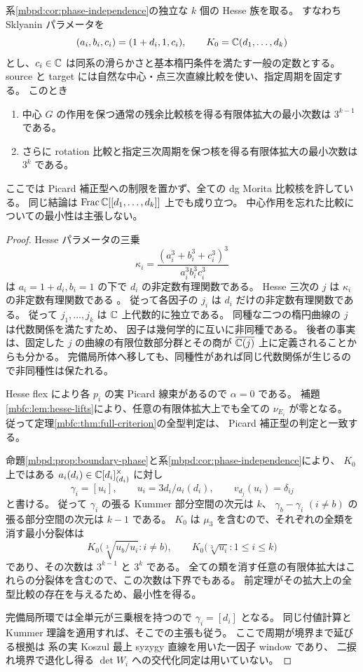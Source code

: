 \begin{theorem}[独立境界位相の全比較核に対する鋭い次数]
\label{mbfc:thm:sharp-all-types}
系\ref{mbpd:cor:phase-independence}の独立な $k$ 個の Hesse 族を取る。
すなわち Sklyanin パラメータを
\[
 (a_i,b_i,c_i)=(1+d_i,1,c_i),\qquad
 K_0=\mathbb C(d_1,\ldots,d_k)
\]
とし、$c_i\in\mathbb C$ は同系の滑らかさと基本楕円条件を満たす一般の定数とする。
source と target には自然な中心・点三次直線比較を使い、指定周期を固定する。
このとき
\begin{enumerate}
 \item 中心 $G$ の作用を保つ通常の残余比較核を得る有限体拡大の最小次数は
       $3^{k-1}$ である。
 \item さらに rotation 比較と指定三次周期を保つ核を得る有限体拡大の最小次数は
       $3^k$ である。
\end{enumerate}
ここでは Picard 補正型への制限を置かず、全ての dg Morita 比較核を許している。
同じ結論は $\operatorname{Frac}\mathbb C[[d_1,\ldots,d_k]]$ 上でも成り立つ。
中心作用を忘れた比較についての最小性は主張しない。
\end{theorem}
\begin{proof}
Hesse パラメータの三乗
\[
 \kappa_i=\frac{(a_i^3+b_i^3+c_i^3)^3}{a_i^3b_i^3c_i^3}
\]
は $a_i=1+d_i,b_i=1$ の下で $d_i$ の非定数有理関数である。
Hesse 三次の $j$ は $\kappa_i$ の非定数有理関数である
\cite[\S2, equations~(4)--(5)]{NFMArtebaniDolgachev}。
従って各因子の $j_i$ は $d_i$ だけの非定数有理関数である。
従って $j_1,\ldots,j_k$ は $\mathbb C$ 上代数的に独立である。
同種な二つの楕円曲線の $j$ は代数関係を満たすため、
因子は幾何学的に互いに非同種である。
後者の事実は、固定した $j$ の曲線の有限位数部分群とその商が
$\overline{\mathbb C(j)}$ 上に定義されることからも分かる。
完備局所体へ移しても、同種性があれば同じ代数関係が生じるので非同種性は保たれる。

Hesse flex により各 $p_i$ の実 Picard 線束があるので $\alpha=0$ である。
補題\ref{mbfc:lem:hesse-lifts}により、任意の有限体拡大上でも全ての
$\nu_{E_i}$ が零となる。
従って定理\ref{mbfc:thm:full-criterion}の全型判定は、
Picard 補正型の判定と一致する。

命題\ref{mbpd:prop:boundary-phase}と系\ref{mbpd:cor:phase-independence}により、
$K_0$ 上ではある $a_i(d_i)\in\mathbb C[d_i]_{(d_i)}^\times$ に対し
\[
 \gamma_i=[u_i],\qquad u_i=3d_i/a_i(d_i),\qquad
 v_{d_j}(u_i)=\delta_{ij}
\]
と書ける。
従って $\gamma_i$ の張る Kummer 部分空間の次元は $k$、
$\gamma_b-\gamma_i$ $(i\ne b)$ の張る部分空間の次元は $k-1$ である。
$K_0$ は $\mu_3$ を含むので、それぞれの全類を消す最小分裂体は
\[
 K_0\bigl(\sqrt[3]{u_b/u_i}:i\ne b\bigr),\qquad
 K_0\bigl(\sqrt[3]{u_i}:1\le i\le k\bigr)
\]
であり、その次数は $3^{k-1}$ と $3^k$ である。
全ての類を消す任意の有限体拡大はこれらの分裂体を含むので、この次数は下界でもある。
前定理がその拡大上の全型比較の存在を与えるため、最小性を得る。

完備局所環では全単元が三乗根を持つので $\gamma_i=[d_i]$ となる。
同じ付値計算と Kummer 理論を適用すれば、そこでの主張も従う。
ここで周期が境界まで延びる根拠は
系の実 Koszul 最上 syzygy 直線を用いた一因子 window であり、
二捩れ境界で退化し得る $\det W_i$ への交代化同定は用いていない。
\end{proof}

